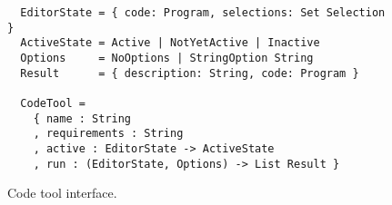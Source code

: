 \begin{figure}[t]

\small


\begin{Verbatim}
  EditorState = { code: Program, selections: Set Selection }
  ActiveState = Active | NotYetActive | Inactive
  Options     = NoOptions | StringOption String
  Result      = { description: String, code: Program }

  CodeTool =
    { name : String
    , requirements : String
    , active : EditorState -> ActiveState
    , run : (EditorState, Options) -> List Result }
\end{Verbatim}
%
\caption{Code tool interface.}
\label{fig:code-tool-interface}
\end{figure}
